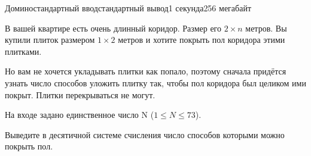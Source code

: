 \begin{problem}{Домино}{стандартный ввод}{стандартный вывод}{1 секунда}{256 мегабайт}

В вашей квартире есть очень длинный коридор. Размер его $2\times n$ метров. Вы купили плиток размером $1\times 2$ метров и хотите покрыть пол коридора этими плитками.

Но вам не хочется укладывать плитки как попало, поэтому сначала придётся узнать число способов уложить плитку так, чтобы пол коридора был целиком ими покрыт. Плитки перекрываться не могут.


\InputFile
На входе задано единственное число N ($1 \le N \le 73$).

\OutputFile
Выведите в десятичной системе счисления число способов которыми можно покрыть пол.

\Example

\begin{example}
%
\end{example}

\end{problem}

